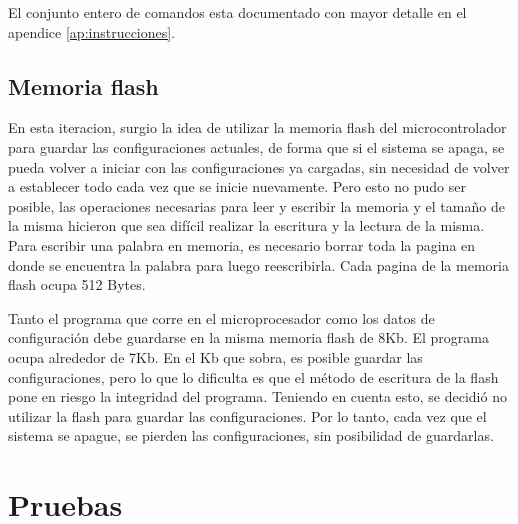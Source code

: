 El conjunto entero de comandos esta documentado con mayor detalle en el apendice \ref{ap:instrucciones}.

\subsection{Memoria flash} %
\label{it5:sub:memoria_flash}

En esta iteracion, surgio la idea de utilizar la memoria flash del microcontrolador para guardar las configuraciones actuales, de forma que si el sistema se apaga, se pueda volver a iniciar con las configuraciones ya cargadas, sin necesidad de volver a establecer todo cada vez que se inicie nuevamente. Pero esto no pudo ser posible, las operaciones necesarias para leer y escribir la memoria y el tamaño de la misma hicieron que sea difícil realizar la escritura y la lectura de la misma. Para escribir una palabra en memoria, es necesario borrar toda la pagina en donde se encuentra la palabra para luego reescribirla. Cada pagina de la memoria flash ocupa 512 Bytes.

Tanto el programa que corre en el microprocesador como los datos de configuración debe guardarse en la misma memoria flash de 8Kb. El programa ocupa alrededor de 7Kb. En el Kb que sobra, es posible guardar las configuraciones, pero lo que lo dificulta es que el método de escritura de la flash pone en riesgo la integridad del programa. Teniendo en cuenta esto, se decidió no utilizar la flash para guardar las configuraciones. Por lo tanto, cada vez que el sistema se apague, se pierden las configuraciones, sin posibilidad de guardarlas.



\section{Pruebas} %
\label{it5:sec:pruebas}

